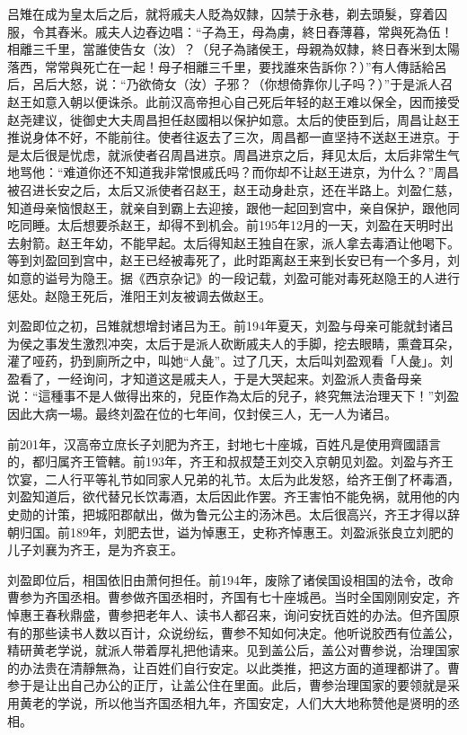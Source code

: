 吕雉在成为皇太后之后，就将戚夫人貶為奴隸，囚禁于永巷，剃去頭髮，穿着囚服，令其舂米。戚夫人边舂边唱：“子為王，母為虜，終日舂薄暮，常與死為伍！相離三千里，當誰使告女（汝）？（兒子為諸侯王，母親為奴隸，終日舂米到太陽落西，常常與死亡在一起！母子相離三千里，要找誰來告訴你？）”有人傳話給呂后，呂后大怒，说：“乃欲倚女（汝）子邪？（你想倚靠你儿子吗？）”于是派人召赵王如意入朝以便诛杀。此前汉高帝担心自己死后年轻的赵王难以保全，因而接受赵尧建议，徙御史大夫周昌担任赵國相以保护如意。太后的使臣到后，周昌让赵王推说身体不好，不能前往。使者往返去了三次，周昌都一直坚持不送赵王进京。于是太后很是忧虑，就派使者召周昌进京。周昌进京之后，拜见太后，太后非常生气地骂他：“难道你还不知道我非常恨戚氏吗？而你却不让赵王进京，为什么？”周昌被召进长安之后，太后又派使者召赵王，赵王动身赴京，还在半路上。刘盈仁慈，知道母亲恼恨赵王，就亲自到霸上去迎接，跟他一起回到宫中，亲自保护，跟他同吃同睡。太后想要杀赵王，却得不到机会。前195年12月的一天，刘盈在天明时出去射箭。赵王年幼，不能早起。太后得知赵王独自在家，派人拿去毒酒让他喝下。等到刘盈回到宫中，赵王已经被毒死了，此时距离赵王来到长安已有一个多月，刘如意的谥号为隐王。据《西京杂记》的一段记载，刘盈可能对毒死赵隐王的人进行惩处。赵隐王死后，淮阳王刘友被调去做赵王。

刘盈即位之初，吕雉就想增封诸吕为王。前194年夏天，刘盈与母亲可能就封诸吕为侯之事发生激烈冲突，太后于是派人砍断戚夫人的手脚，挖去眼睛，熏聋耳朵，灌了哑药，扔到廁所之中，叫她“人彘”。过了几天，太后叫刘盈观看「人彘」。刘盈看了，一经询问，才知道这是戚夫人，于是大哭起来。刘盈派人责备母亲说：“這種事不是人做得出來的，兒臣作為太后的兒子，終究無法治理天下！”刘盈因此大病一場。最终刘盈在位的七年间，仅封侯三人，无一人为诸吕。

前201年，汉高帝立庶长子刘肥为齐王，封地七十座城，百姓凡是使用齊國語言的，都归属齐王管轄。前193年，齐王和叔叔楚王刘交入京朝见刘盈。刘盈与齐王饮宴，二人行平等礼节如同家人兄弟的礼节。太后为此发怒，给齐王倒了杯毒酒，刘盈知道后，欲代替兄长饮毒酒，太后因此作罢。齐王害怕不能免祸，就用他的内史勋的计策，把城阳郡献出，做为鲁元公主的汤沐邑。太后很高兴，齐王才得以辞朝归国。前189年，刘肥去世，谥为悼惠王，史称齐悼惠王。刘盈派张良立刘肥的儿子刘襄为齐王，是为齐哀王。

刘盈即位后，相国依旧由萧何担任。前194年，废除了诸侯国设相国的法令，改命曹参为齐国丞相。曹参做齐国丞相时，齐国有七十座城邑。当时全国刚刚安定，齐悼惠王春秋鼎盛，曹参把老年人、读书人都召来，询问安抚百姓的办法。但齐国原有的那些读书人数以百计，众说纷纭，曹参不知如何决定。他听说胶西有位盖公，精研黄老学说，就派人带着厚礼把他请来。见到盖公后，盖公对曹参说，治理国家的办法贵在清靜無為，让百姓们自行安定。以此类推，把这方面的道理都讲了。曹参于是让出自己办公的正厅，让盖公住在里面。此后，曹参治理国家的要领就是采用黄老的学说，所以他当齐国丞相九年，齐国安定，人们大大地称赞他是贤明的丞相。

